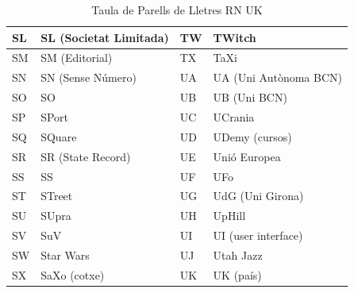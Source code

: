 \begin{table}[ht]
\begin{tabular}{|l|l|l|l|}
        SL & SL (Societat Limitada) & TW & TWitch                \\ \hline
        SM & SM (Editorial)         & TX & TaXi                  \\ \hline
        SN & SN (Sense Número)      & UA & UA (Uni Autònoma BCN) \\ \hline
        SO & SO                     & UB & UB (Uni BCN)          \\ \hline
        SP & SPort                  & UC & UCrania               \\ \hline
        SQ & SQuare                 & UD & UDemy (cursos)        \\ \hline
        SR & SR (State Record)      & UE & Unió Europea          \\ \hline
        SS & SS                     & UF & UFo                   \\ \hline
        ST & STreet                 & UG & UdG (Uni Girona)      \\ \hline
        SU & SUpra                  & UH & UpHill                \\ \hline
        SV & SuV                    & UI & UI (user interface)   \\ \hline
        SW & Star Wars              & UJ & Utah Jazz             \\ \hline
        SX & SaXo (cotxe)           & UK & UK (país)             \\ \hline
    \end{tabular}
    \caption{Taula de Parells de Lletres RN \rightarrow UK}
    \label{tla:lletres-7}
\end{table}

